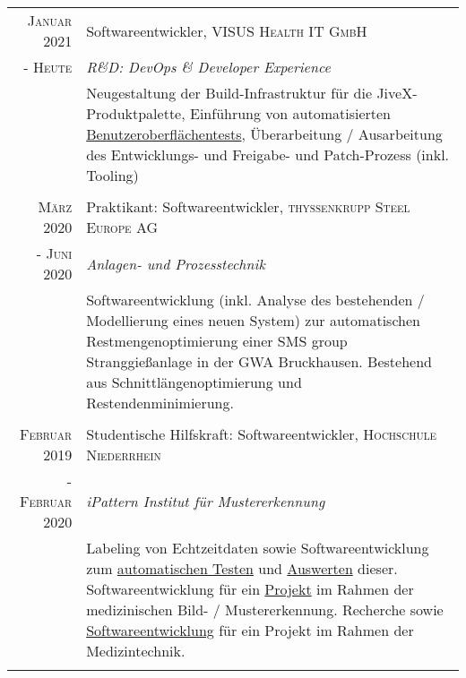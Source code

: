 \documentclass[10pt,a4paper]{article}
\begin{document}
\begin{tabular}{r|p{11cm}}
	\textsc{Januar} 2021 & Softwareentwickler, \textsc{VISUS Health IT GmbH} \\
	- \textsc{Heute} & \emph{R\&D: DevOps \& Developer Experience} \\
	& \footnotesize{Neugestaltung der Build-Infrastruktur f\"ur die JiveX-Produktpalette, Einf\"uhrung von automatisierten \href{https://www.qfs.de}{Benutzeroberfl\"achentests}, \"Uberarbeitung / Ausarbeitung des Entwicklungs- und Freigabe- und Patch-Prozess (inkl. Tooling)} \\
	\multicolumn{2}{c}{} \\
	
	\textsc{M\"arz} 2020 & Praktikant: Softwareentwickler, \textsc{thyssenkrupp Steel Europe AG} \\
	- \textsc{Juni} 2020 & \emph{Anlagen- und Prozesstechnik} \\
	& \footnotesize{Softwareentwicklung (inkl. Analyse des bestehenden / Modellierung eines neuen System) zur automatischen Restmengenoptimierung einer SMS group Stranggie\ss anlage in der GWA Bruckhausen. Bestehend aus Schnittl\"angenoptimierung und Restendenminimierung.} \\
	\multicolumn{2}{c}{} \\

 	\textsc{Februar} 2019	& Studentische Hilfskraft: Softwareentwickler, \textsc{Hochschule Niederrhein} \\
	- \textsc{Februar} 2020	& \emph{iPattern Institut f\"ur Mustererkennung} \\
	& \footnotesize{Labeling von Echtzeitdaten sowie Softwareentwicklung zum \href{https://github.com/thahnen/labelbox-export-minifier}{automatischen Testen} und \href{https://github.com/thahnen/labelbox-scripts-etc}{Auswerten} dieser. Softwareentwicklung f\"ur ein \href{https://www.hs-niederrhein.de/ipattern/nachrichten-detailseite/?tx_news_pi1\%5Bnews\%5D=9545\&cHash=3202e26ca1ce23d3b3231df1f5c5a573}{Projekt} im Rahmen der medizinischen Bild- / Mustererkennung. Recherche sowie \href{https://github.com/thahnen/elastix-scripts-etc}{Softwareentwicklung} f\"ur ein Projekt im Rahmen der Medizintechnik.} \\
	\multicolumn{2}{c}{} \\
	

\end{tabular}
\end{document}
